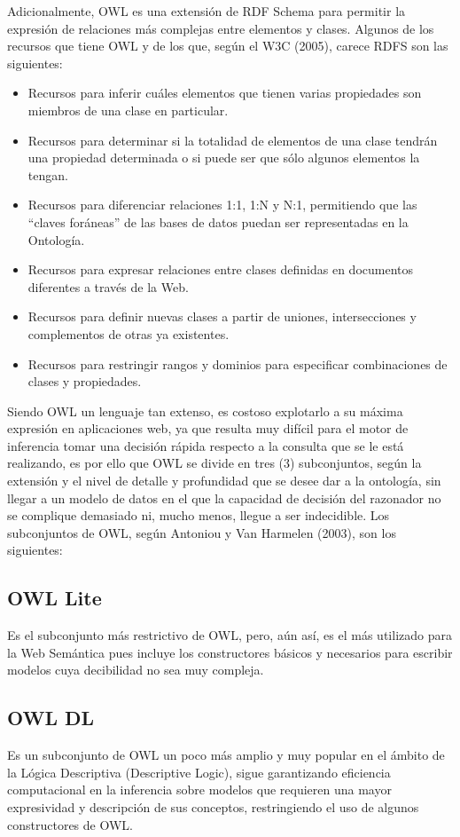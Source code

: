 Adicionalmente, OWL es una extensión de RDF Schema para permitir la expresión de relaciones más complejas entre elementos y clases. Algunos de los recursos que tiene OWL y de los que, según el W3C (2005), carece RDFS son las siguientes:

\begin{itemize}
\item Recursos para inferir cuáles elementos que tienen varias propiedades son miembros de una clase en particular.
\item Recursos para determinar si la totalidad de elementos de una clase tendrán una propiedad determinada o si puede ser que sólo algunos elementos la tengan.
\item Recursos para diferenciar relaciones 1:1, 1:N y N:1, permitiendo que las ``claves foráneas'' de las bases de datos puedan ser representadas en la Ontología.
\item Recursos para expresar relaciones entre clases definidas en documentos diferentes a través de la Web.
\item Recursos para definir nuevas clases a partir de uniones, intersecciones y complementos de otras ya existentes.
\item Recursos para restringir rangos y dominios para especificar combinaciones de clases y propiedades.
\end{itemize}

Siendo OWL un lenguaje tan extenso, es costoso explotarlo a su máxima expresión en aplicaciones web, ya que resulta muy difícil para el motor de inferencia tomar una decisión rápida respecto a la consulta que se le está realizando, es por ello que OWL se divide en tres (3) subconjuntos, según la extensión y el nivel de detalle y profundidad que se desee dar a la ontología, sin llegar a un modelo de datos en el que la capacidad de decisión del razonador no se complique demasiado ni, mucho menos, llegue a ser indecidible. Los subconjuntos de OWL, según Antoniou y Van Harmelen (2003), son los siguientes:

\subsection{OWL Lite}
Es el subconjunto más restrictivo de OWL, pero, aún así, es el más utilizado para la Web Semántica pues incluye los constructores básicos y necesarios para escribir modelos cuya decibilidad no sea muy compleja.

\subsection{OWL DL}
Es un subconjunto de OWL un poco más amplio y muy popular en el ámbito de la Lógica Descriptiva (Descriptive Logic), sigue garantizando eficiencia computacional en la inferencia sobre modelos que requieren una mayor expresividad y descripción de sus conceptos, restringiendo el uso de algunos constructores de OWL.

